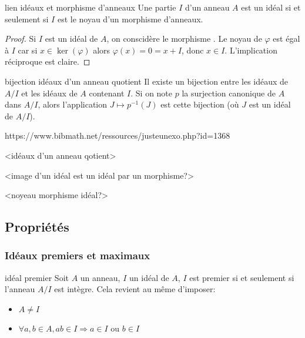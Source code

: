 \begin{proposition}{lien idéaux et morphisme d'anneaux}{}
    Une partie $I$ d'un anneau $A$ est un idéal si et seulement si $I$
    est le noyau d'un morphisme d'anneaux.
\end{proposition}

\begin{proof}
    Si $I$ est un idéal de $A$, on conscidère le morphisme . \newline
    Le noyau de $\varphi$ est égal à $I$ car si $x \in \ker(\varphi)$ alors $\varphi(x) = 0 = x + I$,
    donc $x \in I$.
    L'implication réciproque est claire.
\end{proof}


\begin{theorem}{bijection idéaux d'un anneau quotient}{}
    Il existe un bijection entre les idéaux de $A/I$ et les idéaux de $A$ contenant $I$.\newline
    Si on note $p$ la surjection canonique de $A$ dans $A/I$, 
    alors l'application $J \mapsto p^{-1}(J)$ est cette bijection 
    (où $J$ est un idéal de $A/I$).
\end{theorem}



https://www.bibmath.net/ressources/justeunexo.php?id=1368

<idéaux d'un anneau qotient>

<image d'un idéal est un idéal par un morphisme?>

<noyeau morphisme idéal?>



\subsection{Propriétés}

\subsubsection{Idéaux premiers et maximaux}

\begin{definition}{idéal premier}{}
    Soit $A$ un anneau, $I$ un idéal de $A$, $I$ est premier si et seulement si l'anneau $A/I$ est intègre.
    Cela revient au même d'imposer:
    \begin{itemize}
        \item $A \neq I$
        \item $\forall a, b \in A, ab \in I \Longrightarrow a \in I$ ou $ b \in I$
    \end{itemize}
\end{definition}

